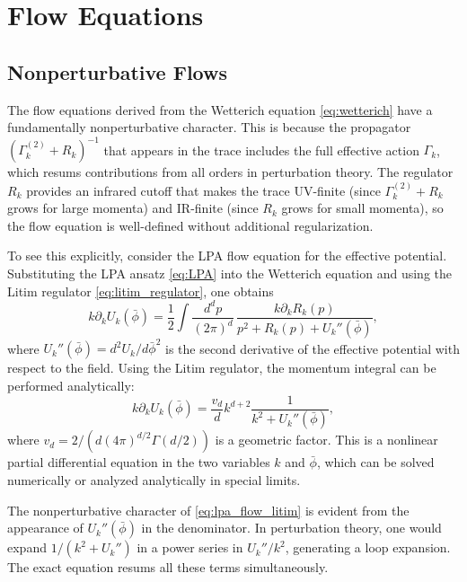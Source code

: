 \documentclass[11pt, twoside, openright]{book}
\theoremstyle{dotted}
\theoremstyle{definition}
\newcommand{\Gk}{\Gamma_k}             %
\newcommand{\Gktwo}{\Gamma_k^{(2)}}   %
\newcommand{\Rk}{R_k}                  %
\newcommand{\kdk}{k\partial_k}         %
\begin{document}
\chapter{Flow Equations}
\label{ch:flow_equations}

\section{Nonperturbative Flows}

The flow equations derived from the Wetterich equation \eqref{eq:wetterich} have a
fundamentally nonperturbative character. This is because the propagator
$(\Gktwo + \Rk)^{-1}$ that appears in the trace includes the full effective action
$\Gk$, which resums contributions from all orders in perturbation theory. The
regulator $\Rk$ provides an infrared cutoff that makes the trace UV-finite (since
$\Gktwo + \Rk$ grows for large momenta) and IR-finite (since $\Rk$ grows for small
momenta), so the flow equation is well-defined without additional regularization.

To see this explicitly, consider the LPA flow equation for the effective potential.
Substituting the LPA ansatz \eqref{eq:LPA} into the Wetterich equation and using
the Litim regulator \eqref{eq:litim_regulator}, one obtains
\begin{equation}
  \kdk U_k(\bar\phi) = \frac{1}{2} \int \frac{d^dp}{(2\pi)^d} \,
  \frac{\kdk \Rk(p)}{p^2 + \Rk(p) + U_k''(\bar\phi)},
  \label{eq:lpa_flow}
\end{equation}
where $U_k''(\bar\phi) = d^2 U_k/d\bar\phi^2$ is the second derivative of the
effective potential with respect to the field. Using the Litim regulator, the
momentum integral can be performed analytically:
\begin{equation}
  \kdk U_k(\bar\phi) = \frac{v_d}{d} k^{d+2} \frac{1}{k^2 + U_k''(\bar\phi)},
  \label{eq:lpa_flow_litim}
\end{equation}
where $v_d = 2/(d(4\pi)^{d/2}\Gamma(d/2))$ is a geometric factor. This is a
nonlinear partial differential equation in the two variables $k$ and $\bar\phi$,
which can be solved numerically or analyzed analytically in special limits.

The nonperturbative character of \eqref{eq:lpa_flow_litim} is evident from the
appearance of $U_k''(\bar\phi)$ in the denominator. In perturbation theory,
one would expand $1/(k^2 + U_k'')$ in a power series in $U_k''/k^2$, generating
a loop expansion. The exact equation resums all these terms simultaneously.
\end{document}

